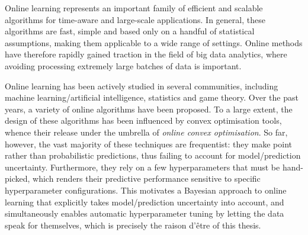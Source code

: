 %
%
%
%
%
%

Online learning \citep{lugosi, shalev-shwartz11, oco} represents an important family of efficient and scalable algorithms for time-aware and large-scale applications. In general, these algorithms are fast, simple and based only on a handful of statistical assumptions, making them applicable to a wide range of settings. Online methods have therefore rapidly gained traction in the field of big data analytics, where avoiding processing extremely large batches of data is important.

Online learning has been actively studied in several communities, including machine learning/artificial intelligence, statistics and game theory. Over the past years, a variety of online algorithms have been proposed. To a large extent, the design of these algorithms has been influenced by convex optimisation tools, whence their release under the umbrella of \emph{online convex optimisation}. So far, however, the vast majority of these techniques are frequentist: they make point rather than probabilistic predictions, thus failing to account for model/prediction uncertainty. Furthermore, they rely on a few hyperparameters that must be hand-picked, which renders their predictive performance sensitive to specific hyperparameter configurations. This motivates a Bayesian approach to online learning that explicitly takes model/prediction uncertainty into account, and simultaneously enables automatic hyperparameter tuning by letting the data speak for themselves, which is precisely the raison d'\^{e}tre of this thesis.

